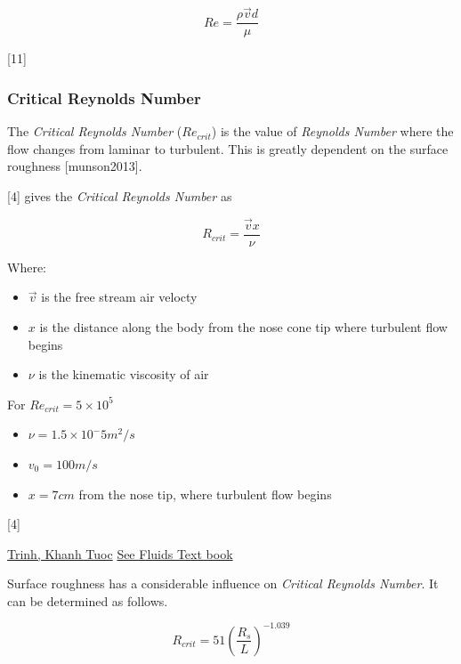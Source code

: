 \documentclass[]{article}
\providecommand{\tightlist}{%
  \setlength{\itemsep}{0pt}\setlength{\parskip}{0pt}}
\begin{document}
\begin{equation}
\label{eq_reynolds_number_theory}
Re = \dfrac{\rho \vec{v} d}{\mu}
\end{equation}

{[}11{]}

\subsubsection{Critical Reynolds Number}\label{critical-reynolds-number}

The \emph{Critical Reynolds Number} (\(Re_{crit}\)) is the value of
\emph{Reynolds Number} where the flow changes from laminar to turbulent.
This is greatly dependent on the surface roughness {[}munson2013{]}.

{[}4{]} gives the \emph{Critical Reynolds Number} as

\begin{equation}
\label{eq_reynolds_number_critical}
R_{crit} = \dfrac{\vec{v} x} {\nu}
\end{equation}

Where:

\begin{itemize}
\tightlist
\item
  \(\vec{v}\) is the free stream air velocty
\item
  \(x\) is the distance along the body from the nose cone tip where
  turbulent flow begins
\item
  \(\nu\) is the kinematic viscosity of air
\end{itemize}

For \(Re_{crit} = 5 \times 10^5\)

\begin{itemize}
\tightlist
\item
  \(\nu = 1.5 \times 10^-5 m^2/s\)
\item
  \(v_0 = 100 m/s\)
\item
  \(x = 7 cm\) from the nose tip, where turbulent flow begins
\end{itemize}

{[}4{]}

\href{http://arxiv.org/ftp/arxiv/papers/1007/1007.0810.pdf}{Trinh, Khanh
Tuoc} \href{fluids\%20textbook}{See Fluids Text book}

Surface roughness has a considerable influence on \emph{Critical
Reynolds Number}. It can be determined as follows.

\begin{equation}
\label{eq_reynolds_number_critical_roughness}
R_{crit} = 51 \left( \dfrac{R_s}{L} \right)^{-1.039}
\end{equation}
\end{document}
